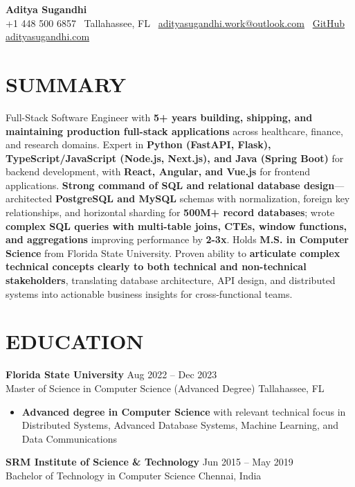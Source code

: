 \documentclass[letterpaper,10pt]{article}
\newcommand{\resumeItem}[1]{\item\small #1}
\newcommand{\resumeSubheading}[4]{
  \vspace{6pt}
  \noindent
  \textbf{#1} \hfill {\footnotesize #2} \\
  [-1pt]
  \noindent
  \small #3 \hfill {\small #4}
  \vspace{3pt}
}
\newcommand{\resumeItemsStart}{\vspace{-2pt}\begin{itemize}}
\newcommand{\resumeItemsEnd}{\end{itemize}\vspace{6pt}}
\begin{document}
\begin{center}
{\huge\textbf{Aditya Sugandhi}} \\
+1 448 500 6857 \textbar\ \textcolor{metablue}{Tallahassee, FL} \textbar\
\href{mailto:adityasugandhi.work@outlook.com}{adityasugandhi.work@outlook.com} \textbar\
\href{https://github.com/adityasugandhi}{GitHub}
\textbar \href{https://adityasugandhi.com}{adityasugandhi.com}
\end{center}
\vspace{-12pt}

\section{\textcolor{metablue}{SUMMARY}}
\small
\vspace{-6pt}
Full-Stack Software Engineer with \textbf{5+ years building, shipping, and maintaining production full-stack applications} across healthcare, finance, and research domains. Expert in \textbf{Python (FastAPI, Flask), TypeScript/JavaScript (Node.js, Next.js), and Java (Spring Boot)} for backend development, with \textbf{React, Angular, and Vue.js} for frontend applications. \textbf{Strong command of SQL and relational database design}—architected \textbf{PostgreSQL and MySQL} schemas with normalization, foreign key relationships, and horizontal sharding for \textbf{500M+ record databases}; wrote \textbf{complex SQL queries with multi-table joins, CTEs, window functions, and aggregations} improving performance by \textbf{2-3x}. Holds \textbf{M.S. in Computer Science} from Florida State University. Proven ability to \textbf{articulate complex technical concepts clearly to both technical and non-technical stakeholders}, translating database architecture, API design, and distributed systems into actionable business insights for cross-functional teams.

\vspace{-9pt}

\section{\textcolor{metablue}{EDUCATION}}
\vspace{-10pt}
\resumeSubheading
{Florida State University}{Aug 2022 -- Dec 2023}
{Master of Science in Computer Science (Advanced Degree)}{Tallahassee, FL}
\resumeItemsStart
\resumeItem{\textbf{Advanced degree in Computer Science} with relevant technical focus in Distributed Systems, Advanced Database Systems, Machine Learning, and Data Communications}
\resumeItemsEnd
\vspace{-5pt}
\resumeSubheading
{SRM Institute of Science \& Technology}{Jun 2015 -- May 2019}
{Bachelor of Technology in Computer Science}{Chennai, India}
\vspace{-10pt}
\end{document}
